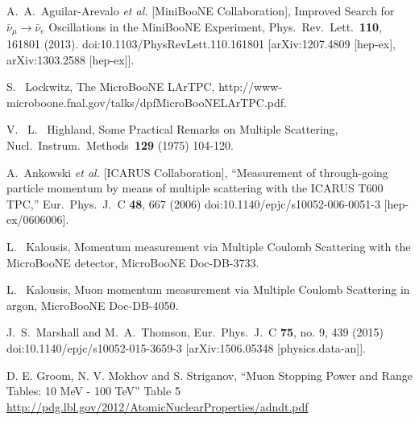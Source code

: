 \documentclass[a4paper,11pt]{article}
\begin{document}
\begin{thebibliography}{99}




  A.~A.~Aguilar-Arevalo {\it et al.} 
  [MiniBooNE Collaboration],
  Improved Search for $\bar \nu_\mu \rightarrow \bar \nu_e$ Oscillations in the MiniBooNE Experiment,
  Phys.\ Rev.\ Lett.\  {\bf 110}, 161801 (2013).
  doi:10.1103/PhysRevLett.110.161801
  [arXiv:1207.4809 [hep-ex], arXiv:1303.2588 [hep-ex]].

  S. ~Lockwitz, 
  The MicroBooNE LArTPC,
  http://www-microboone.fnal.gov/talks/dpfMicroBooNELArTPC.pdf.

  V. ~L. ~Highland, 
  Some Practical Remarks on Multiple Scattering, 
  Nucl.\ Instrum.\ Methods\ {\bf 129} (1975)
  104-120.
 
  A.~Ankowski {\it et al.} [ICARUS Collaboration],
  ``Measurement of through-going particle momentum by means of multiple scattering with the ICARUS T600 TPC,''
  Eur.\ Phys.\ J.\ C {\bf 48}, 667 (2006)
  doi:10.1140/epjc/s10052-006-0051-3
  [hep-ex/0606006].

  L. ~Kalousis, 
  Momentum measurement via Multiple Coulomb
  Scattering with the MicroBooNE detector, 
  MicroBooNE Doc-DB-3733.


  L. ~Kalousis, 
  Muon momentum measurement via Multiple Coulomb Scattering in argon,
  MicroBooNE Doc-DB-4050.

  J.~S.~Marshall and M.~A.~Thomson,
  Eur.\ Phys.\ J.\ C {\bf 75}, no. 9, 439 (2015)
  doi:10.1140/epjc/s10052-015-3659-3
  [arXiv:1506.05348 [physics.data-an]].

  D. E. Groom, N. V. Mokhov and S. Striganov, ``Muon Stopping Power and Range Tables: 10 MeV - 100 TeV'' Table 5
  \url{http://pdg.lbl.gov/2012/AtomicNuclearProperties/adndt.pdf}



\end{thebibliography}
\end{document}
